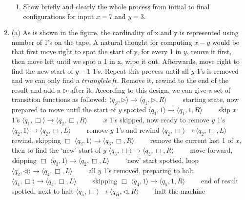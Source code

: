 \documentclass[12pt,a4paper]{article}
\makeatletter
\newtheorem*{solution}{Solution}
\theoremstyle{definition}
\renewenvironment{solution}[1][Solution] {\par\pushQED{\qed}\normalfont\topsep6\p@\@plus6\p@\relax\trivlist\item[\hskip\labelsep\bfseries#1\@addpunct{.}]\ignorespaces}{\popQED\endtrivlist\@endpefalse} \makeatother
\makeatother
\begin{document}
\begin{enumerate}
\begin{enumerate}
        \item
        Show briefly and clearly the whole process from initial to final configurations for input $x = 7$ and $y = 3$.
    \end{enumerate}
    \begin{solution}
        (a) As is shown in the figure, the cardinality of x and y is represented using number of 1's on the tape. A natural thought for computing $x-y$ would be that first move right to spot the start of y, for every 1 in $y$, remve it first, then move left until we spot a 1 in x, wipe it out. Afterwards, move right to find the new start of $y-1$ 1's. Repeat this process until all $y$ 1's is removed and we can only find a $triangleleft$. Remove it, rewind to the end of the result and add a $\triangleright$ after it. According to this design, we can give a set of transition functions as followed:\newline
        $\langle q_S, \triangleright \rangle \rightarrow \langle q_1, \triangleright,  R\rangle\qquad$ starting state, now prepared to move until the start of $y$ spotted\newline
        $\langle q_1, 1 \rangle \rightarrow \langle q_1, 1,  R\rangle\qquad$ skip $x$ 1's\newline
        $\langle q_1, \Box \rangle \rightarrow \langle q_2, \Box,  R\rangle\qquad$ $x$ 1's skipped, now ready to remove $y$ 1's\newline
        $\langle q_2, 1 \rangle \rightarrow \langle q_2, \Box,  L\rangle\qquad$  remove $y$ 1's and rewind\newline
        $\langle q_2, \Box \rangle \rightarrow \langle q_2, \Box,  L\rangle\qquad$  rewind, skipping $\Box$\newline
        $\langle q_2, 1 \rangle \rightarrow \langle q_3, \Box,  R\rangle\qquad$  remove the current last 1 of $x$, then to find the `new' start of  $y$\newline
        $\langle q_3, \Box \rangle \rightarrow \langle q_3, \Box,  R\rangle\qquad$  move forward, skipping $\Box$\newline
        $\langle q_3, 1 \rangle \rightarrow \langle q_2, \Box,  L\rangle\qquad$  `new' start spotted, loop\newline
        $\langle q_2, \triangleleft \rangle \rightarrow \langle q_4, \Box,  L\rangle\qquad$ all $y$ 1's removed, preparing to halt\newline
        $\langle q_4, \Box \rangle \rightarrow \langle q_4, \Box,  L\rangle\qquad$ skipping $\Box$\newline
        $\langle q_4, 1 \rangle \rightarrow \langle q_5, 1,  R\rangle\qquad$ end of result spotted, next to halt\newline
        $\langle q_5, \Box \rangle \rightarrow \langle q_H, \triangleleft,  R\rangle\qquad$ halt the machine


\end{solution}
\end{enumerate}
\end{document}
